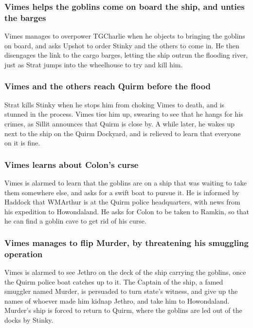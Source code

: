 \subsubsection{\Gls{Vimes} helps the goblins come on board the ship, and unties the barges}
\Gls{Vimes} manages to overpower \Gls{TGCharlie} when he objects to bringing the goblins on board,
and asks \Gls{Upshot} to order \Gls{Stinky} and the others to come in. He then disengages the
link to the cargo barges, letting the ship outrun the flooding river, just as \Gls{Strat} jumps into
the wheelhouse to try and kill him.

\subsubsection{\Gls{Vimes} and the others reach Quirm before the flood}
\Gls{Strat} kills \Gls{Stinky} when he stops him from choking \Gls{Vimes} to death, and is stunned
in the process. \Gls{Vimes} ties him up, swearing to see that he hangs for his crimes, as
\Gls{Sillit} announces that Quirm is close by. A while later, he wakes up next to the ship on the
Quirm Dockyard, and is relieved to learn that everyone on it is fine.

\subsubsection{\Gls{Vimes} learns about \Gls{Colon}'s curse}
\Gls{Vimes} is alarmed to learn that the goblins are on a ship that was waiting to take them
somewhere else, and asks for a swift boat to pursue it. He is informed by \Gls{Haddock} that
\Gls{WMArthur} is at the Quirm police headquarters, with news from his expedition to Howondaland.
He asks for \Gls{Colon} to be taken to \Gls{Ramkin}, so that he can find a goblin cave to get rid
of his curse.

\subsubsection{\Gls{Vimes} manages to flip \Gls{Murder}, by threatening his smuggling operation}
\Gls{Vimes} is alarmed to see \Gls{Jethro} on the deck of the ship carrying the goblins, once the
Quirm police boat catches up to it. The Captain of the ship, a famed smuggler named \Gls{Murder},
is persuaded to turn state's witness, and give up the names of whoever made him kidnap \Gls{Jethro},
and take him to Howondaland. \Gls{Murder}'s ship is forced to return to Quirm, where the goblins
are led out of the docks by \Gls{Stinky}.

